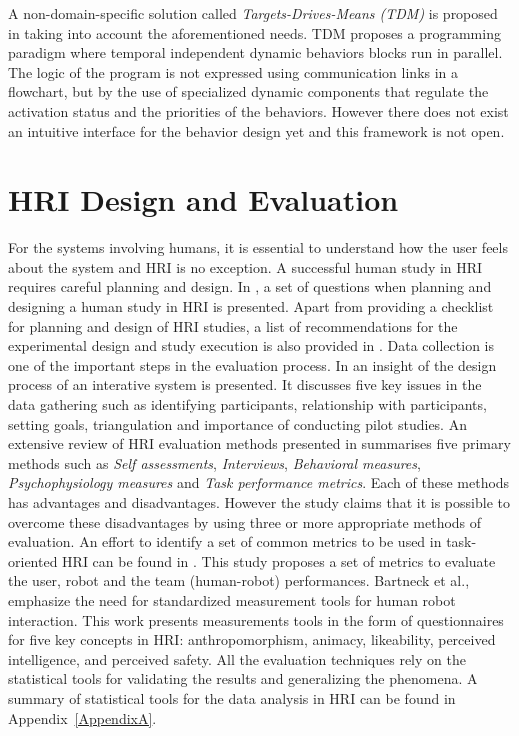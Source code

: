 A non-domain-specific solution called \emph{Targets-Drives-Means (TDM)} is proposed in \cite{berenz2014targets} taking into account the aforementioned needs. TDM proposes a programming paradigm where temporal independent dynamic behaviors blocks run in parallel. The logic of the program is not expressed using communication links in a flowchart, but by the use of specialized dynamic components that regulate the activation status and the priorities of the behaviors. However there does not exist an intuitive interface for the behavior design yet and this framework is not open.
\section{HRI Design and Evaluation} %
For the systems involving humans, it is essential to understand how the user feels about the system and HRI is no exception. A successful human study in HRI requires careful planning and design. In \cite{bethel2010review}, a set of questions when planning and designing a human study in HRI is presented. Apart from providing a checklist for planning and design of HRI studies, a list of recommendations for the experimental design and study execution is also provided in \cite{bethel2010review}.	Data collection is one of the important steps in the evaluation process. In \cite{Rogers2011} an insight of the design process of an interative system is presented. It discusses five key issues in the data gathering such as identifying participants, relationship with participants, setting goals, triangulation and importance of conducting pilot studies. An extensive review of HRI evaluation methods presented in \cite{bethel2010review} summarises five primary methods such as \emph{Self assessments}, \emph{Interviews}, \emph{Behavioral measures}, \emph{Psychophysiology measures} and \emph{Task performance metrics}. Each of these methods has advantages and disadvantages. However the study claims that it is possible to overcome these disadvantages by using three or more appropriate methods of evaluation. An effort to identify a set of common metrics to be used in task-oriented HRI can be found in \cite{Steinfeld2006}. This study proposes a set of metrics to evaluate the user, robot and the team (human-robot) performances. Bartneck et al., \cite{bartneck2009measurement} emphasize the need for standardized measurement tools for human robot interaction. This work presents measurements tools in the form of questionnaires for five key concepts in HRI: anthropomorphism, animacy, likeability, perceived intelligence, and perceived safety. All the evaluation techniques rely on the statistical tools for validating the results and generalizing the phenomena. A summary of statistical tools for the data analysis in HRI can be found in Appendix~\ref{AppendixA}.

